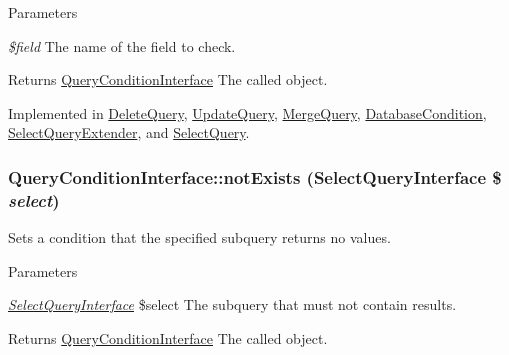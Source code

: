 \begin{DoxyParams}{Parameters}
\item[{\em \$field}]The name of the field to check.\end{DoxyParams}
\begin{DoxyReturn}{Returns}
\hyperlink{interfaceQueryConditionInterface}{QueryConditionInterface} The called object. 
\end{DoxyReturn}


Implemented in \hyperlink{classDeleteQuery_a2b252e7602b7b0e677ef79ae33af7dcd}{DeleteQuery}, \hyperlink{classUpdateQuery_a027756e0adb3f423fd0c19ecbb3ec751}{UpdateQuery}, \hyperlink{classMergeQuery_a010c4f710e0e242d9d89383a49573376}{MergeQuery}, \hyperlink{classDatabaseCondition_af4ff7dba8bee46426fbc8b5930d860f0}{DatabaseCondition}, \hyperlink{classSelectQueryExtender_ad30e0f469cabfcc18f148468cc507cd8}{SelectQueryExtender}, and \hyperlink{classSelectQuery_ab278e789f0e46f588f6d2c5cf030d3d8}{SelectQuery}.\hypertarget{interfaceQueryConditionInterface_a8aae11796846850edbf8caa3a9d4afcd}{
\subsubsection[{notExists}]{\setlength{\rightskip}{0pt plus 5cm}QueryConditionInterface::notExists ({\bf SelectQueryInterface} \$ {\em select})}}
\label{interfaceQueryConditionInterface_a8aae11796846850edbf8caa3a9d4afcd}
Sets a condition that the specified subquery returns no values.


\begin{DoxyParams}{Parameters}
\item[{\em \hyperlink{interfaceSelectQueryInterface}{SelectQueryInterface}}]\$select The subquery that must not contain results.\end{DoxyParams}
\begin{DoxyReturn}{Returns}
\hyperlink{interfaceQueryConditionInterface}{QueryConditionInterface} The called object. 
\end{DoxyReturn}


